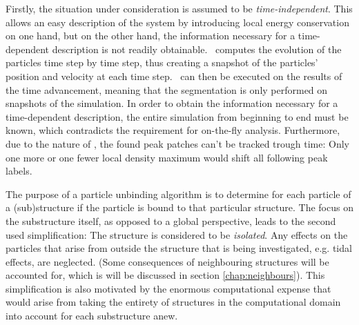 Firstly, the situation under consideration is assumed to be \emph{time-independent}.
This allows an easy description of the system by introducing local energy conservation on one hand, but on the other hand, the information necessary for a time-dependent description is not readily obtainable.
\ramses\ computes the evolution of the particles time step by time step, thus creating a snapshot of the particles' position and velocity at each time step. 
\phew\ can then be executed on the results of the time advancement, meaning that the segmentation is only performed on snapshots of the simulation. 
In order to obtain the information necessary for a time-dependent description, the entire simulation from beginning to end must be known, which contradicts the requirement for on-the-fly analysis.
Furthermore, due to the nature of \phew, the found peak patches can't be tracked trough time:
Only one more or one fewer local density maximum would shift all following peak labels.


The purpose of a particle unbinding algorithm is to determine for each particle of a (sub)structure if the particle is bound to that particular structure. 
The focus on the substructure itself, as opposed to a global perspective, leads to the second used simplification: 
The structure is considered to be \emph{isolated}.
Any effects on the particles that arise from outside the structure that is being investigated, e.g. tidal effects, are neglected.
(Some consequences of neighbouring structures will be accounted for, which is will be discussed in section \ref{chap:neighbours}).
This simplification is also motivated by the enormous computational expense that would arise from taking the entirety of structures in the computational domain into account for each substructure anew.

